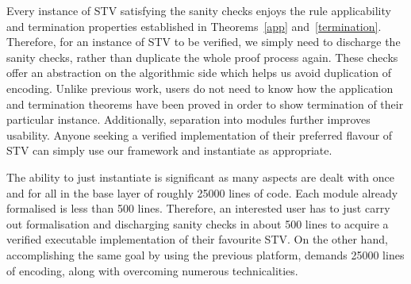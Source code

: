\documentclass{llncs}
\begin{document}
Every instance of STV satisfying the sanity checks enjoys the
rule applicability and termination properties established in
Theorems~\ref{app} and~\ref{termination}. Therefore, for an instance
of STV to be verified, we simply need to 
discharge 
the sanity checks, rather than duplicate the whole proof process again. These checks
offer an abstraction on the algorithmic side which helps us
avoid
duplication of encoding. Unlike previous work, users do
not need to know how the application  and termination theorems have been
proved in order to show termination of their particular instance. Additionally, separation into modules
further improves usability. Anyone seeking a verified implementation of
their preferred flavour of STV can simply use our framework and
instantiate as appropriate.

The ability to just instantiate is significant as many
aspects are dealt with once and for all
in the base layer of roughly 25000 lines of
code. Each module already formalised is less than 500 lines.
Therefore, an interested user has to just carry out formalisation
and discharging sanity checks in about 500 lines to acquire a
verified executable implementation of their favourite STV. On the
other hand, accomplishing the same goal by using the previous
platform, demands  25000 lines of encoding, along with overcoming
numerous technicalities.   
\end{document}

